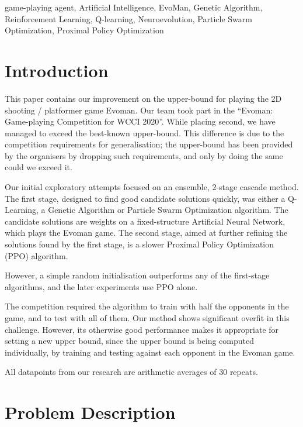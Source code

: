 \documentclass[conference]{IEEEtran}
\begin{document}
    \begin{IEEEkeywords}
        game-playing agent, Artificial Intelligence, EvoMan, Genetic Algorithm, Reinforcement Learning,
        Q-learning, Neuroevolution, Particle Swarm Optimization, Proximal Policy Optimization
    \end{IEEEkeywords}


    \section{Introduction}\label{sec:introduction}
    This paper contains our improvement on the upper-bound for playing the 2D shooting / platformer game Evoman\cite{evoman}.
    Our team took part in the ``Evoman: Game-playing Competition for WCCI 2020''\cite{evoman_competition}. While placing second\cite{evoman_competition_results}, we have managed to exceed the best-known upper-bound. This difference is due to the competition requirements for generalisation; the upper-bound has been provided by the organisers by dropping such requirements, and only by doing the same could we exceed it.

    Our initial exploratory attempts focused on an ensemble, $2$-stage cascade method. The first stage, designed to find good candidate solutions quickly, was either a Q-Learning\cite{q_learning}, a Genetic Algorithm\cite{genetic_algorithm} or Particle Swarm Optimization\cite{pso} algorithm. The candidate solutions are weights on a fixed-structure Artificial Neural Network, which plays the Evoman game. The second stage, aimed at further refining the solutions found by the first stage, is a slower Proximal Policy Optimization (PPO)\cite{ppo} algorithm.

    However, a simple random initialisation outperforms any of the first-stage algorithms, and the later experiments use PPO alone.

    The competition required the algorithm to train with half the opponents in the game, and to test with all of them. Our method shows significant overfit in this challenge. However, its otherwise good performance makes it appropriate for setting a new upper bound, since the upper bound is being computed individually, by training and testing against each opponent in the Evoman game.

    All datapoints from our research are arithmetic averages of $30$ repeats.

    \section{Problem Description}\label{sec:problem-description}
\end{document}

